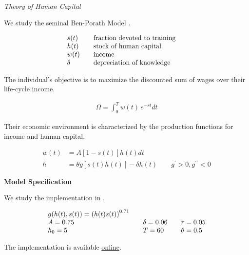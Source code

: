 \begin{frame}\begin{center}
		\LARGE\textit{Theory of Human Capital}
\end{center}\end{frame}
\begin{frame}
We study the seminal Ben-Porath Model \cite{Ben-Porath.1967}.

\begin{align*}\begin{array}{l@{\qquad}l@{\qquad}l}
s(t) 	& \text{fraction devoted to training} \\
h(t)    & \text{stock of human capital} \\
w(t)	& \text{income} \\
\delta  & \text{depreciation of knowledge}
\end{array}\end{align*}
\end{frame}
\begin{frame}
The individual's objective is to maximize the discounted sum of wages over their life-cycle income.

\begin{align*}
\Omega = \int^T_0 w(t)\, e^{-r t} dt
\end{align*}
\end{frame}

\begin{frame}
Their economic environment is characterized by the production functions for income and human capital.

\begin{align*}
w(t)    & = A[1 - s(t)]h(t)dt \\
\dot{h} & = \theta g[s(t) h(t)] - \delta h(t) \qquad g^\prime > 0, g^{\prime\prime} < 0
\end{align*}

\end{frame}
\begin{frame}\textbf{Model Specification}\vspace{0.3cm}

We study the implementation in .

\begin{align*}\begin{array}{l@{\qquad}l@{\qquad}l}
	g(h(t), s(t)) = \left(h(t) s(t)\right)^{0.71} & & \\
	A = 0.75 & \delta = 0.06 & r = 0.05\\
	h_0 = 5 & T = 60 & \theta = 0.5
\end{array}\end{align*}

The implementation is available \href{http://bit.ly/2I2bMpb}{online}.
\end{frame}


